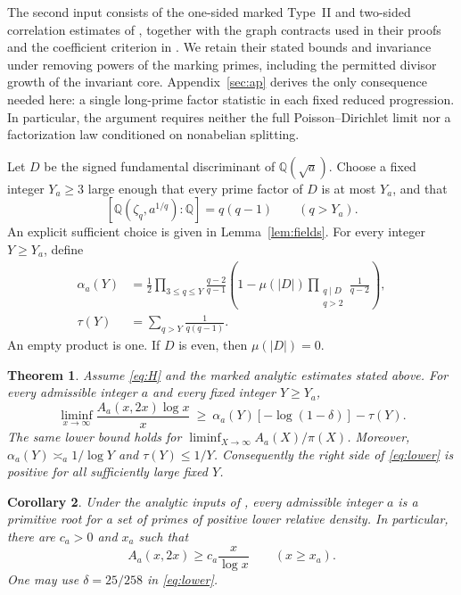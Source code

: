 \documentclass[11pt]{article}
\newtheorem{theorem}{Theorem}[section]
\newtheorem{corollary}[theorem]{Corollary}
\theoremstyle{remark}
\newcommand{\1}{\mathbf 1}
\newcommand{\Q}{\mathbb Q}
\begin{document}
The second input consists of the one-sided marked Type~II and
two-sided correlation estimates of \cite[Sections~3 and 6]{PD},
together with the graph contracts used in their proofs and the
coefficient criterion in \cite[Lemma~10.2]{OAI}.  We retain their
stated bounds and invariance under removing powers of the marking
primes, including the permitted divisor growth of the invariant
core.  Appendix~\ref{sec:ap}
derives the only consequence needed here: a single long-prime
factor statistic in each fixed reduced progression.  In particular,
the argument requires neither the full Poisson--Dirichlet limit
nor a factorization law conditioned on nonabelian splitting.

Let $D$ be the signed fundamental discriminant of $\Q(\sqrt a)$.
Choose a fixed integer $Y_a\ge3$ large enough that every prime
factor of $D$ is at most $Y_a$, and that
\begin{equation}\label{eq:degree-choice}
 [\Q(\zeta_q,a^{1/q}):\Q]=q(q-1)\qquad(q>Y_a).
\end{equation}
An explicit sufficient choice is given in Lemma~\ref{lem:fields}.
For every integer $Y\ge Y_a$, define
\begin{align}
 \alpha_a(Y)
 &=\frac12\prod_{3\le q\le Y}\frac{q-2}{q-1}
 \left(1-\mu(|D|)
       \prod_{\substack{q\mid D\\q>2}}\frac1{q-2}\right),
 \label{eq:alpha}\\
 \tau(Y)&=\sum_{q>Y}\frac1{q(q-1)}.
 \label{eq:tau}
\end{align}
An empty product is one.  If $D$ is even, then $\mu(|D|)=0$.

\begin{theorem}\label{thm:main}
Assume \eqref{eq:H} and the marked analytic estimates stated above.
For every admissible integer $a$ and every fixed integer $Y\ge Y_a$,
\begin{equation}\label{eq:lower}
 \liminf_{x\to\infty}\frac{A_a(x,2x)\log x}{x}
 \ \ge\ \alpha_a(Y)[-\log(1-\delta)]-\tau(Y).
\end{equation}
The same lower bound holds for
$\liminf_{X\to\infty}A_a(X)/\pi(X)$.  Moreover,
$\alpha_a(Y)\asymp_a1/\log Y$ and $\tau(Y)\le1/Y$.
Consequently the right side of \eqref{eq:lower} is positive for
all sufficiently large fixed $Y$.
\end{theorem}

\begin{corollary}\label{cor:positive}
Under the analytic inputs of \cite{OAI,PD,Strip}, every admissible
integer $a$ is a primitive root for a set of primes of positive
lower relative density.  In particular, there are $c_a>0$ and
$x_a$ such that
\[
 A_a(x,2x)\ge c_a\frac{x}{\log x}\qquad(x\ge x_a).
\]
One may use $\delta=25/258$ in \eqref{eq:lower}.
\end{corollary}
\end{document}
